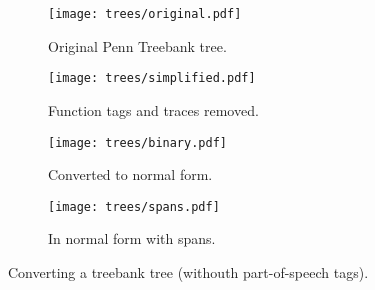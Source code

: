 \begin{figure}
	\centering
  \begin{subfigure}{0.72\textwidth}
		\texttt{[image: trees/original.pdf]}
    \caption{Original Penn Treebank tree.}
		\label{fig:tree-original}
	\end{subfigure}
	\begin{subfigure}{0.62\textwidth}
		\texttt{[image: trees/simplified.pdf]}
    \caption{Function tags and traces removed.}
		\label{fig:tree-simplified}
	\end{subfigure}
	\begin{subfigure}{0.62\textwidth}
		\texttt{[image: trees/binary.pdf]}
    \caption{Converted to normal form.}
		\label{fig:tree-cnf}
	\end{subfigure}
	\begin{subfigure}{0.9\textwidth}
		\texttt{[image: trees/spans.pdf]}
    \caption{In normal form with spans.}
		\label{fig:tree-cnf-spans}
	\end{subfigure}
  \caption{Converting a treebank tree (withouth part-of-speech tags).}
  \label{fig:trees}
\end{figure}

%       
% 		  
% 		  
% 		  

